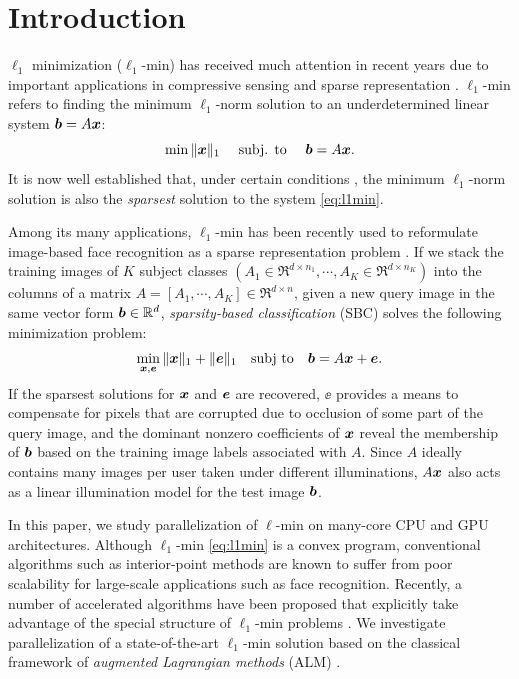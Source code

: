 \documentclass[10pt,twocolumn,letterpaper]{article}
\begin{document}
\section{Introduction} 
$\ell_1$ minimization ($\ell_1$-min) has received much attention in recent
years due to important applications in compressive sensing
\cite{BrucksteinA2007} and sparse representation \cite{WrightJ2010-PIEEE}.  
$\ell_1$-min refers to finding the minimum $\ell_1$-norm solution to an
underdetermined linear system ${\boldsymbol{b}}=A{\boldsymbol{x}}$:
\begin{equation}
\min \|{\boldsymbol{x}}\|_1\quad \mbox{ subj. to }\quad {\boldsymbol{b}} = A{\boldsymbol{x}}.
\label{eq:l1min}
\end{equation}
It is now well established that, under certain conditions
\cite{CandesE2005-IT_1,DonohoD2004}, the minimum $\ell_1$-norm solution is also
the \emph{sparsest} solution to the system \eqref{eq:l1min}.

Among its many applications, $\ell_1$-min has been recently used to reformulate
image-based face recognition as a sparse representation problem
\cite{WrightJ2009-PAMI}.  If we stack the training images of $K$ subject
classes $(A_1\in\Re^{d\times n_1}, \cdots, A_K\in\Re^{d\times n_K})$ into the
columns of a matrix $A = [A_1, \cdots, A_K]\in\Re^{d\times n}$, given a new
query image in the same vector form ${\boldsymbol{b}}\in{\mathbb{R}}^d$, \emph{sparsity-based
classification} (SBC) solves the following minimization problem:
\begin{equation}
\min_{{\boldsymbol{x}}, {\boldsymbol{e}}} \| {\boldsymbol{x}} \|_1 + \|{\boldsymbol{e}}\|_1 \quad \textup{subj to} \quad {\boldsymbol{b}} = A {\boldsymbol{x}} + {\boldsymbol{e}}.
\label{eq:l1min_denoise}
\end{equation}
If the sparsest solutions for ${\boldsymbol{x}}$ and $\boldsymbol{e}$ are recovered, $\ee$ provides a
means to compensate for pixels that are corrupted due to occlusion of some part of the query
image, and the dominant nonzero coefficients of ${\boldsymbol{x}}$ reveal the membership of
${\boldsymbol{b}}$ based on the training image labels associated with $A$.  Since $A$ ideally
contains many images per user taken under different illuminations, 
$A{\boldsymbol{x}}$ also acts as a linear illumination model for the test image ${\boldsymbol{b}}$.

In this paper, we study parallelization of $\ell$-min on many-core CPU and GPU
architectures. Although $\ell_1$-min \eqref{eq:l1min} is a convex
program, conventional algorithms such as interior-point methods
\cite{ChenS2001-SIAM,TibshiraniR1996} are known to suffer from poor scalability
for large-scale applications such as face recognition. Recently, a number of
accelerated algorithms have been proposed that explicitly take advantage of
the special structure of $\ell_1$-min problems
\cite{LorisI2009,YangA2010-ICIP}. We investigate parallelization of a
state-of-the-art $\ell_1$-min solution based on the classical framework of
\emph{augmented Lagrangian methods} (ALM) \cite{BertsekasD2003,YangA2010-ICIP}.
\end{document}
